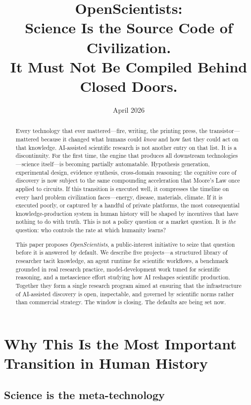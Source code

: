 \documentclass[11pt]{article}
\title{\textbf{OpenScientists:\\Science Is the Source Code of Civilization.\\It Must Not Be Compiled Behind Closed Doors.}}
\author{}
\date{April 2026}
\begin{document}
\maketitle

\begin{abstract}
Every technology that ever mattered---fire, writing, the printing press, the transistor---mattered because it changed what humans could \emph{know} and how fast they could act on that knowledge. AI-assisted scientific research is not another entry on that list. It is a discontinuity. For the first time, the engine that produces all downstream technologies---science itself---is becoming partially automatable. Hypothesis generation, experimental design, evidence synthesis, cross-domain reasoning: the cognitive core of discovery is now subject to the same compounding acceleration that Moore's Law once applied to circuits. If this transition is executed well, it compresses the timeline on every hard problem civilization faces---energy, disease, materials, climate. If it is executed poorly, or captured by a handful of private platforms, the most consequential knowledge-production system in human history will be shaped by incentives that have nothing to do with truth. This is not a policy question or a market question. It is \emph{the} question: who controls the rate at which humanity learns?

This paper proposes \emph{OpenScientists}, a public-interest initiative to seize that question before it is answered by default. We describe five projects---a structured library of researcher tacit knowledge, an agent runtime for scientific workflows, a benchmark grounded in real research practice, model-development work tuned for scientific reasoning, and a metascience effort studying how AI reshapes scientific production. Together they form a single research program aimed at ensuring that the infrastructure of AI-assisted discovery is open, inspectable, and governed by scientific norms rather than commercial strategy. The window is closing. The defaults are being set now.
\end{abstract}

\section{Why This Is the Most Important Transition in Human History}

\subsection{Science is the meta-technology}
\end{document}
